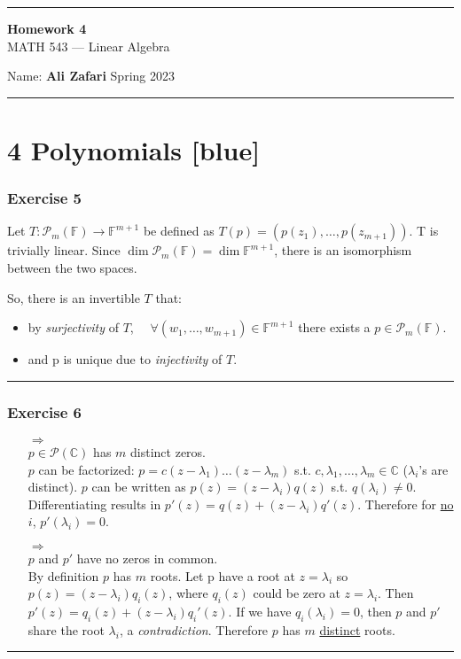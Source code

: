 \documentclass[12pt, letterpaper]{scrartcl}
\newcommand{\C}{\mathbb{C}}
\newcommand{\F}{\mathbb{F}}
\begin{document}
\begin{center}
    \hrule
    \vspace{0.4cm}
    { \textbf{{\large Homework 4}} \\ MATH 543 --- Linear Algebra}
\end{center}
{ Name: \textbf{Ali Zafari} \hspace{\fill} Spring 2023 } \newline\hrule

\section*{4 Polynomials \xrfill[2pt]{3pt}[blue]}
\subsubsection*{Exercise 5}
Let $T:\mathcal{P}_m(\F)\rightarrow\F^{m+1}$
be defined as $T(p)=(p(z_1), \dots, p(z_{m+1}))$. T is trivially linear. Since $\dim\mathcal{P}_m(\F)=\dim\F^{m+1}$, there is an isomorphism between the two spaces.

So, there is an invertible $T$ that:
\begin{itemize}
    \item by \emph{surjectivity} of $T$, $\quad\forall (w_1,\dots, w_{m+1})\in \F^{m+1}$ there exists a $p\in\mathcal{P}_m(\F)$.
    \item and p is unique due to \emph{injectivity} of $T$.
\end{itemize}
 
\vskip1mm\hrule

\subsubsection*{Exercise 6}
\begin{itemize}
    \item[$\Longrightarrow$]\mbox{}\\
    $p\in\mathcal{P}(\C)$ has $m$ distinct zeros.\\$p$ can be factorized: $p=c(z-\lambda_1)\dots(z-\lambda_m)$ s.t. $c,\lambda_1,\dots,\lambda_m\in\C$ ($\lambda_i$'s are distinct). $p$ can be written as $p(z)=(z-\lambda_i)q(z)$ s.t. $q(\lambda_i)\neq0$. Differentiating results in $p'(z)=q(z)+(z-\lambda_i)q'(z)$. Therefore for \underline{no $i$}, $p'(\lambda_i)=0$.
    
    \item[$\Longrightarrow$]\mbox{}\\
    $p$ and $p'$ have no zeros in common.\\By definition $p$ has $m$ roots. Let p have a root at $z=\lambda_i$ so $p(z)=(z-\lambda_i)q_i(z)$, where $q_i(z)$ could be zero at $z=\lambda_i$. Then $p'(z)=q_i(z)+(z-\lambda_i)q_i'(z)$. If we have $q_i(\lambda_i)=0$, then $p$ and $p'$ share the root $\lambda_i$, a \emph{contradiction}. Therefore $p$ has $m$ \underline{distinct} roots.
\end{itemize}
\vskip1mm\hrule
\end{document}
